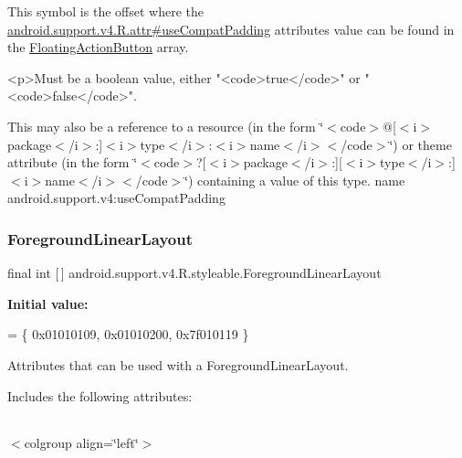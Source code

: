 This symbol is the offset where the \hyperlink{classandroid_1_1support_1_1v4_1_1R_1_1attr_a0a5254de741dc249871162023aef2477}{android.\+support.\+v4.\+R.\+attr\#use\+Compat\+Padding} attribute\textquotesingle{}s value can be found in the \hyperlink{classandroid_1_1support_1_1v4_1_1R_1_1styleable_ad3363bb32f8e5e0dde36b5e32146816b}{Floating\+Action\+Button} array.

\begin{DoxyVerb}      <p>Must be a boolean value, either "<code>true</code>" or "<code>false</code>".
\end{DoxyVerb}
 

This may also be a reference to a resource (in the form \char`\"{}$<$code$>$@\mbox{[}$<$i$>$package$<$/i$>$\+:\mbox{]}$<$i$>$type$<$/i$>$\+:$<$i$>$name$<$/i$>$$<$/code$>$\char`\"{}) or theme attribute (in the form \char`\"{}$<$code$>$?\mbox{[}$<$i$>$package$<$/i$>$\+:\mbox{]}\mbox{[}$<$i$>$type$<$/i$>$\+:\mbox{]}$<$i$>$name$<$/i$>$$<$/code$>$\char`\"{}) containing a value of this type.  name android.\+support.\+v4\+:use\+Compat\+Padding \mbox{\label{classandroid_1_1support_1_1v4_1_1R_1_1styleable_aa17438061ec7746b98c639b096be8466}} 
\subsubsection{\texorpdfstring{Foreground\+Linear\+Layout}{ForegroundLinearLayout}}
{\footnotesize\ttfamily final int \mbox{[}$\,$\mbox{]} android.\+support.\+v4.\+R.\+styleable.\+Foreground\+Linear\+Layout\hspace{0.3cm}{\ttfamily [static]}}

{\bfseries Initial value\+:}
\begin{DoxyCode}
= \{
            0x01010109, 0x01010200, 0x7f010119
        \}
\end{DoxyCode}
Attributes that can be used with a Foreground\+Linear\+Layout. 

Includes the following attributes\+:

\tabulinesep=1mm
\begin{longtabu} spread 0pt [c]{*{0}{|X[-1]}|}
\hline
\end{longtabu}
$<$colgroup align=\char`\"{}left\char`\"{}$>$ 

